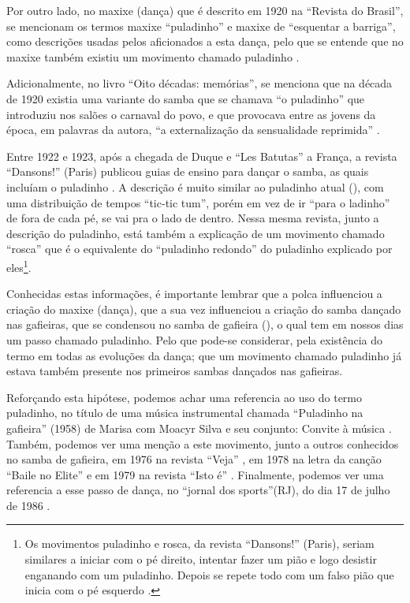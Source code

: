 Por outro lado, no maxixe (dança)  que é descrito em 1920 na ``Revista do Brasil'',
se mencionam os termos maxixe ``puladinho'' e maxixe de ``esquentar a barriga'',
como descrições usadas pelos aficionados a esta dança, 
pelo que se entende que no maxixe também existiu um movimento chamado puladinho \cite[pp. 177]{1920revista}. 

Adicionalmente, no livro ``Oito décadas: memórias'', se menciona que na década de
1920 existia uma variante do samba que se chamava ``o puladinho'' 
que introduziu nos salões o carnaval do povo, 
e que provocava entre as jovens da época, em palavras da autora, 
``a externalização da sensualidade reprimida'' \cite[pp. 94-95]{nabuco2000oito}.

Entre 1922 e 1923, após a chegada de Duque e ``Les Batutas'' a França, 
a revista ``Dansons!'' (Paris) publicou guias de ensino para dançar o samba, %
as quais incluíam o puladinho \cite[pp. 3]{Dansons:15} \cite[pp. 7]{Dansons:25}.
A descrição é muito similar ao puladinho atual (\AnoLivro), com uma distribuição de tempos ``tic-tic tum'',
porém em vez de ir ``para o ladinho'' de fora de cada pé, se vai pra o lado de dentro.
Nessa mesma revista, junto a descrição do puladinho, está também a explicação de um movimento chamado ``rosca'' 
que é o equivalente do ``puladinho redondo'' do puladinho explicado por eles\footnote{Os movimentos puladinho e rosca, da revista ``Dansons!'' (Paris), seriam similares a iniciar com o pé direito, intentar fazer um pião e logo desistir enganando com um puladinho. Depois se repete todo com um falso pião que inicia com o pé esquerdo \cite[pp. 3]{Dansons:15} \cite[pp. 7]{Dansons:25}.}. 


Conhecidas estas informações, é importante lembrar que a polca influenciou a criação do maxixe (dança), 
que a sua vez influenciou a criação do samba dançado nas gafieiras,
que se condensou no samba de gafieira (\AnoLivro), o qual tem em nossos dias um passo chamado puladinho. 
Pelo que pode-se considerar, pela existência do termo em todas as evoluções da dança; 
que um movimento chamado puladinho 
já estava também presente nos primeiros sambas dançados nas gafieiras. 

Reforçando esta hipótese, podemos achar uma referencia ao uso do termo puladinho, no título de uma música instrumental chamada 
``Puladinho na gafieira'' (1958)  de  Marisa com Moacyr Silva e seu conjunto: Convite à música \cite{puladinhogafieiramusic}.
Também, podemos ver uma menção a este movimento, junto a outros conhecidos no samba de gafieira,
em 1976 na revista ``Veja'' \cite[pp. 158]{1976veja},
em 1978 na letra da canção ``Baile no Elite'' \cite{BaileNoElite} e 
em 1979 na revista ``Isto é'' \cite[pp. 89]{revista1979isto}.
Finalmente, podemos ver uma referencia a esse passo de dança, no ``jornal dos sports''(RJ),
do dia 17 de julho de 1986 \cite[pp. 6]{gafieiraaredeout2}.


